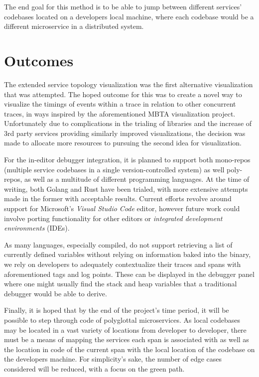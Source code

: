 \documentclass[pdftex,titlepage]{article}
\begin{document}
        The end goal for this method is to be able to jump between different services' codebases located on a developers local machine,
        where each codebase would be a different microservice in a distributed system. 

    \newpage

    \section{Outcomes}

    The extended service topology visualization was the first alternative visualization that was attempted. The hoped outcome for this was 
    to create a novel way to visualize the timings of events within a trace in relation to other concurrent traces, in ways inspired by 
    the aforementioned MBTA visualization  project. Unfortunately due to complications in the trialing of libraries and the increase of 
    3rd party services providing similarly improved visualizations, the decision was made to allocate more resources to pursuing the
    second idea for visualization.

    For the in-editor debugger integration, it is planned to support both mono-repos (multiple service codebases in a single version-controlled
    system) as well poly-repos, as well as a multitude of different programming languages. At the time of writing, both Golang and Rust have been
    trialed, with more extensive attempts made in the former with acceptable results. Current efforts revolve around support for Microsoft's
    \textit{Visual Studio Code} editor, however future work could involve porting functionality for other editors or \textit{integrated development
    environments} (IDEs).

    As many languages, especially compiled, do not support retrieving a list of currently defined variables without relying on information baked
    into the binary, we rely on developers to adequately contextualize their traces and spans with aforementioned tags and log points. These 
    can be displayed in the debugger panel where one might usually find the stack and heap variables that a traditional debugger would be able
    to derive.

    Finally, it is hoped that by the end of the project's time period, it will be possible to step through code of polyglottal microservices.
    As local codebases may be located in a vast variety of locations from developer to developer, there must be a means of mapping the services
    each span is associated with as well as the location in code of the current span with the local location of the codebase on the developers 
    machine. For simplicity's sake, the number of edge cases considered will be reduced, with a focus on the green path. 
\end{document}
